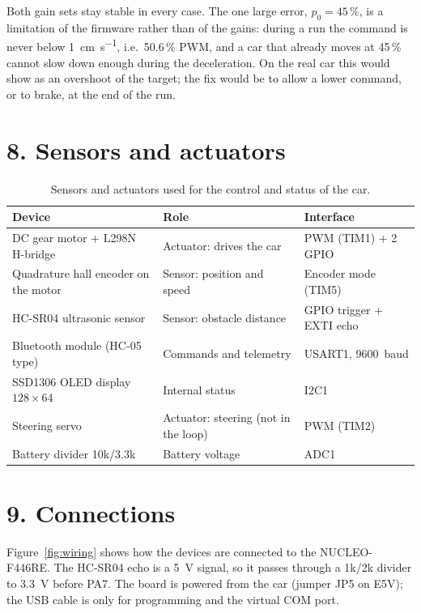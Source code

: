 \documentclass[letterpaper, 11pt]{article}
\begin{document}
Both gain sets stay stable in every case. The one large error, $p_0 = 45\,\%$,
is a limitation of the firmware rather than of the gains: during a run the command
is never below \SI{1}{\centi\meter\per\second}, i.e.\ 50.6\,\% PWM, and a car that
already moves at 45\,\% cannot slow down enough during the deceleration. On the real
car this would show as an overshoot of the target; the fix would be to allow a
lower command, or to brake, at the end of the run.

\section*{8. Sensors and actuators}

\begin{table}[H]
\centering
\caption{Sensors and actuators used for the control and status of the car.}
\label{tab:dev}
\begin{tabular}{@{}lll@{}}
\toprule
Device & Role & Interface \\
\midrule
DC gear motor + L298N H-bridge & Actuator: drives the car & PWM (TIM1) + 2 GPIO \\
Quadrature hall encoder on the motor & Sensor: position and speed & Encoder mode (TIM5) \\
HC-SR04 ultrasonic sensor & Sensor: obstacle distance & GPIO trigger + EXTI echo \\
Bluetooth module (HC-05 type) & Commands and telemetry & USART1, \SI{9600}{baud} \\
SSD1306 OLED display $128\times64$ & Internal status & I2C1 \\
Steering servo & Actuator: steering (not in the loop) & PWM (TIM2) \\
Battery divider 10k/3.3k & Battery voltage & ADC1 \\
\bottomrule
\end{tabular}
\end{table}

\section*{9. Connections}

Figure~\ref{fig:wiring} shows how the devices are connected to the NUCLEO-F446RE.
The HC-SR04 echo is a \SI{5}{\volt} signal, so it passes through a 1k/2k divider
to \SI{3.3}{\volt} before PA7. The board is powered from the car (jumper JP5 on
E5V); the USB cable is only for programming and the virtual COM port.
\end{document}
